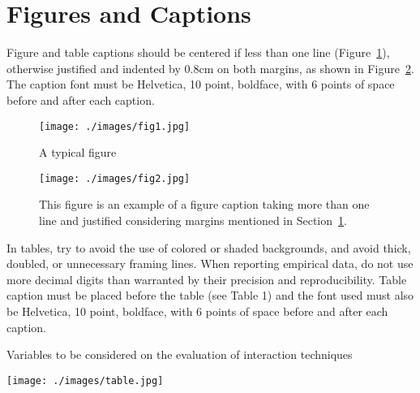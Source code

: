 \section{Figures and Captions}\label{sec:figs}


Figure and table captions should be centered if less than one line
(Figure~\ref{fig:exampleFig1}), otherwise justified and indented by 0.8cm on
both margins, as shown in Figure~\ref{fig:exampleFig2}. The caption font must
be Helvetica, 10 point, boldface, with 6 points of space before and after each
caption.

\begin{figure}[ht]
	\centering
	\texttt{[image: ./images/fig1.jpg]}
	\caption{A typical figure}
	\label{fig:exampleFig1}
\end{figure}

\begin{figure}[ht]
	\centering
	\texttt{[image: ./images/fig2.jpg]}
	\caption{This figure is an example of a figure caption taking more than one
		line and justified considering margins mentioned in Section~\ref{sec:figs}.}
	\label{fig:exampleFig2}
\end{figure}

In tables, try to avoid the use of colored or shaded backgrounds, and avoid
thick, doubled, or unnecessary framing lines. When reporting empirical data,
do not use more decimal digits than warranted by their precision and
reproducibility. Table caption must be placed before the table (see Table 1)
and the font used must also be Helvetica, 10 point, boldface, with 6 points of
space before and after each caption.

\begin{table}[ht]
	\centering
	\caption{Variables to be considered on the evaluation of interaction
		techniques}
	\label{tab:exTable1}
	\texttt{[image: ./images/table.jpg]}
\end{table}